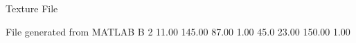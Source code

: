 Texture File

File generated from MATLAB
B 2
   11.00   145.00   87.00  1.00
   45.0   23.00   150.00  1.00
